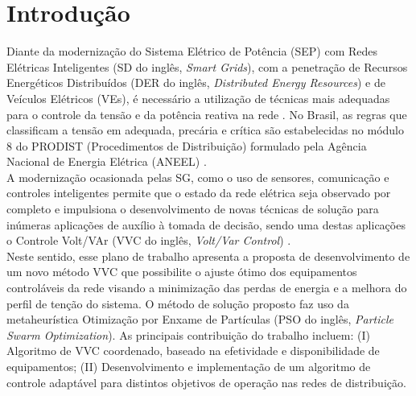 \documentclass[]{IEEEphot}
\begin{document}
\section{Introdução}
Diante da modernização do Sistema Elétrico de Potência (SEP) com Redes Elétricas Inteligentes (SD do inglês, \textit{Smart Grids}), com a penetração de Recursos Energéticos Distribuídos (DER do inglês, \textit{Distributed Energy Resources}) e de Veículos Elétricos (VEs), é necessário a utilização de técnicas mais adequadas para o controle da tensão e da potência reativa na rede \cite{Agostinho2019}. No Brasil, as regras que classificam a tensão em adequada, precária e crítica são estabelecidas no módulo 8 do PRODIST (Procedimentos de Distribuição) formulado pela Agência Nacional de Energia Elétrica (ANEEL) \cite{M8Prodist}.\\
A modernização ocasionada pelas SG, como o uso de sensores, comunicação e controles inteligentes permite que o estado da rede elétrica seja observado por completo e impulsiona o desenvolvimento de novas técnicas de solução para inúmeras aplicações de auxílio à tomada de decisão, sendo uma destas aplicações o Controle Volt/VAr (VVC do inglês, \textit{Volt/Var Control}) \cite{Mello2018}.\\
Neste sentido, esse plano de trabalho apresenta a proposta de desenvolvimento de um novo método VVC que possibilite o ajuste ótimo dos equipamentos controláveis da rede visando a minimização das perdas de energia e a melhora do perfil de tenção do sistema. O método de solução proposto faz uso da metaheurística Otimização por Enxame de Partículas (PSO do inglês, \textit{Particle Swarm Optimization}). As principais contribuição do trabalho incluem: (I) Algoritmo de VVC coordenado, baseado na efetividade e disponibilidade de equipamentos; (II) Desenvolvimento e implementação de um algoritmo de controle adaptável para distintos objetivos de operação nas redes de distribuição. 
 
\end{document}
